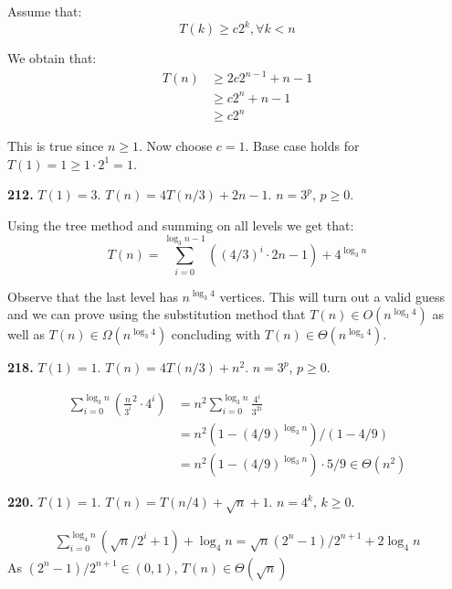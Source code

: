 \documentclass{article}
\renewcommand{\geq}{\geqslant}
\begin{document}
Assume that:
\begin{equation*}
\label{eq-expo3}
T(k) \geq c2^k, \forall k < n
\end{equation*}

We obtain that:
\begin{equation*}
\begin{split}
	T(n)
	 & \geq 2c2^{n-1}+n-1 \\
	 & \geq c2^{n} + n-1 \\
	 & \geq c2^{n}
\end{split}
\end{equation*}

This is true since $n \geq 1$. Now choose $c = 1$. Base case holds for $T(1) = 1 \geq 1 \cdot 2^{1} = 1$.

\noindent\textbf{212.} $T(1) = 3$. $T(n) = 4T(n/3) + 2n - 1$. $n = 3^p$, $p \geq 0$.

Using the tree method and summing on all levels we get that:
\begin{equation*}
	T(n) = \sum_{i = 0}^{\log_3 n - 1}((4/3)^i \cdot 2 n - 1) + 4^{\log_3 n}
\end{equation*}


Observe that the last level has $n^{\log_3 4}$ vertices. This will turn out a valid guess and we can prove using the substitution method that $T(n) \in O(n^{\log_3 4})$ as well as $T(n) \in \Omega(n^{\log_3 4})$ concluding with $T(n) \in \Theta(n^{\log_3 4})$.


\noindent\textbf{218.} $T(1) = 1$. $T(n) = 4T(n/3) + n^2$. $n = 3^p$, $p \geq 0$.

\begin{equation*}
\begin{split}
	\sum_{i = 0}^{\log_3 n}{(\frac{n}{3^i}^2 \cdot 4^i)} &= n^2 \sum_{i = 0}^{\log_3 n}{\frac{4^i}{3^{2i}}} \\
	&= n^2(1 - (4/9)^{\log_3 n}) / (1 - 4/9) \\
	&= n^2 (1 - (4/9)^{\log_3 n}) \cdot 5/9 \in \Theta(n^2)
\end{split}
\end{equation*}

\noindent\textbf{220.} $T(1) = 1$. $T(n) = T(n/4) + \sqrt{n} + 1$. $n = 4^k$, $k \geq 0$.

\begin{equation*}
\begin{split}
	\sum_{i=0}^{\log_4 n}(\sqrt n/2^i + 1) + \log_4 n= \sqrt n (2^n - 1) / 2^{n+1} + 2 \log_4 n
\end{split}
\end{equation*}
As $(2^n - 1) / 2^{n+1} \in (0, 1)$, $T(n) \in \Theta(\sqrt n)$
\end{document}
